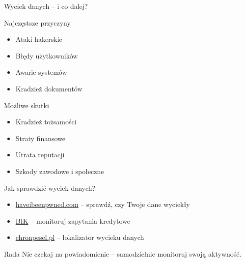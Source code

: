 \begin{frame}{Wyciek danych – i co dalej?}
\begin{alertblock}{Najczęstsze przyczyny}
\begin{itemize}
    \item Ataki hakerskie
    \item Błędy użytkowników
    \item Awarie systemów
    \item Kradzież dokumentów
\end{itemize}
\end{alertblock}
\pause
\begin{exampleblock}{Możliwe skutki}
\begin{itemize}
    \item Kradzież tożsamości
    \item Straty finansowe
    \item Utrata reputacji
    \item Szkody zawodowe i społeczne
\end{itemize}
\end{exampleblock}
\end{frame}

\begin{frame}{Jak sprawdzić wyciek danych?}
\begin{itemize}
    \item \href{https://haveibeenpwned.com}{haveibeenpwned.com} – sprawdź, czy Twoje dane wyciekły
    \item \href{https://www.bik.pl/}{BIK} – monitoruj zapytania kredytowe
    \item \href{https://chronpesel.pl/}{chronpesel.pl} – lokalizator wycieku danych
\end{itemize}
\pause
\begin{alertblock}{Rada}
Nie czekaj na powiadomienie – samodzielnie monitoruj swoją aktywność.
\end{alertblock}
\end{frame}

